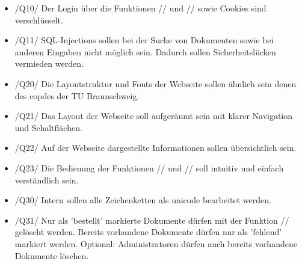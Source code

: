 \begin{itemize}

\item  /Q10/ Der Login über die Funktionen // und // sowie Cookies sind verschlüsselt.
\item  /Q11/ SQL-Injections sollen bei der Suche von Dokumenten sowie bei anderen Eingaben nicht möglich sein. Dadurch sollen Sicherheitslücken vermieden werden.
\item  /Q20/ Die Layoutstruktur und Fonts der Webseite sollen ähnlich sein denen des \Gls{copdes} der TU Braunschweig.
\item  /Q21/ Das Layout der Webseite soll aufgeräumt sein mit klarer Navigation und Schaltflächen.
\item  /Q22/ Auf der Webseite dargestellte Informationen sollen übersichtlich sein.
\item  /Q23/ Die Bedienung der Funktionen // und // soll intuitiv und einfach verständlich sein.
\item  /Q30/ Intern sollen alle Zeichenketten als \Gls{unicode} bearbeitet werden.
\item  /Q31/ Nur als 'bestellt' markierte Dokumente dürfen mit der Funktion // gelöscht werden. Bereits vorhandene Dokumente dürfen nur als 'fehlend' markiert werden. Optional: Administratoren dürfen auch bereits vorhandene Dokumente löschen.

\end{itemize} 